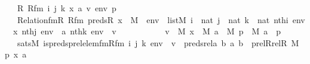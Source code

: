 \begin{isabellebody}
\ \ \ R\ Rfm\ i\ j\ k\ x\ a\ v\ env\ p\isanewline
\ \ \ {\isachardoublequoteopen}Relation{\isacharunderscore}{\kern0pt}fm{\isacharparenleft}{\kern0pt}R{\isacharcomma}{\kern0pt}\ Rfm{\isacharparenright}{\kern0pt}{\isachardoublequoteclose}\ {\isachardoublequoteopen}preds{\isacharparenleft}{\kern0pt}R{\isacharcomma}{\kern0pt}\ x{\isacharparenright}{\kern0pt}\ {\isasymin}\ M{\isachardoublequoteclose}\ \ {\isachardoublequoteopen}env\ {\isasymin}\ list{\isacharparenleft}{\kern0pt}M{\isacharparenright}{\kern0pt}{\isachardoublequoteclose}\ {\isachardoublequoteopen}i\ {\isasymin}\ nat{\isachardoublequoteclose}\ {\isachardoublequoteopen}j\ {\isasymin}\ nat{\isachardoublequoteclose}\ {\isachardoublequoteopen}k\ {\isasymin}\ nat{\isachardoublequoteclose}\ {\isachardoublequoteopen}nth{\isacharparenleft}{\kern0pt}i{\isacharcomma}{\kern0pt}\ env{\isacharparenright}{\kern0pt}\ {\isacharequal}{\kern0pt}\ x{\isachardoublequoteclose}\ {\isachardoublequoteopen}nth{\isacharparenleft}{\kern0pt}j{\isacharcomma}{\kern0pt}\ env{\isacharparenright}{\kern0pt}\ {\isacharequal}{\kern0pt}\ a{\isachardoublequoteclose}\ {\isachardoublequoteopen}nth{\isacharparenleft}{\kern0pt}k{\isacharcomma}{\kern0pt}\ env{\isacharparenright}{\kern0pt}\ {\isacharequal}{\kern0pt}\ v{\isachardoublequoteclose}\ \isanewline
\ \ \ \ \ \ \ \ \ \ {\isachardoublequoteopen}v\ {\isasymin}\ M{\isachardoublequoteclose}\ {\isachardoublequoteopen}x\ {\isasymin}\ M{\isachardoublequoteclose}\ {\isachardoublequoteopen}a\ {\isasymin}\ M{\isachardoublequoteclose}\ {\isachardoublequoteopen}p\ {\isasymin}\ M{\isachardoublequoteclose}\ {\isachardoublequoteopen}a\ {\isasymin}\ p{\isachardoublequoteclose}\ \isanewline
\ \ \ {\isachardoublequoteopen}sats{\isacharparenleft}{\kern0pt}M{\isacharcomma}{\kern0pt}\ is{\isacharunderscore}{\kern0pt}preds{\isacharunderscore}{\kern0pt}prel{\isacharunderscore}{\kern0pt}elem{\isacharunderscore}{\kern0pt}fm{\isacharparenleft}{\kern0pt}Rfm{\isacharcomma}{\kern0pt}\ i{\isacharcomma}{\kern0pt}\ j{\isacharcomma}{\kern0pt}\ k{\isacharparenright}{\kern0pt}{\isacharcomma}{\kern0pt}\ env{\isacharparenright}{\kern0pt}\ {\isasymlongleftrightarrow}\ v\ {\isasymin}\ preds{\isacharunderscore}{\kern0pt}rel{\isacharparenleft}{\kern0pt}{\isasymlambda}a\ b{\isachardot}{\kern0pt}\ {\isacharless}{\kern0pt}a{\isacharcomma}{\kern0pt}\ b{\isachargreater}{\kern0pt}\ {\isasymin}\ prel{\isacharparenleft}{\kern0pt}Rrel{\isacharparenleft}{\kern0pt}R{\isacharcomma}{\kern0pt}\ M{\isacharparenright}{\kern0pt}{\isacharcomma}{\kern0pt}\ p{\isacharparenright}{\kern0pt}{\isacharcomma}{\kern0pt}\ {\isacharless}{\kern0pt}x{\isacharcomma}{\kern0pt}\ a{\isachargreater}{\kern0pt}{\isacharparenright}{\kern0pt}{\isachardoublequoteclose}\ \isanewline

\end{isabellebody}
